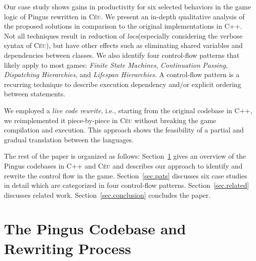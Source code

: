 \documentclass[10pt, conference, compsocconf]{IEEEtran}
\newcommand{\CEU}{\textsc{C\'{e}u}\xspace}
\newcommand{\locs}{\emph{locs}\xspace}
\begin{document}
Our case study shows gains in productivity for six selected behaviors in the
game logic of Pingus rewritten in \CEU.
We present an in-depth qualitative analysis of the proposed solutions in
comparison to the original implementations in C++.
%
Not all techniques result in reduction of \locs (especially considering the
verbose syntax of \CEU), but have other effects such as eliminating shared
variables and dependencies between classes.
%
We also identify four control-flow patterns that likely apply to most games:
        \emph{Finite State Machines},
        \emph{Continuation Passing},
        \emph{Dispatching Hierarchies}, and
        \emph{Lifespan Hierarchies}.
%
A control-flow pattern is a recurring technique to describe execution
dependency and/or explicit ordering between statements.

We employed a \emph{live code rewrite}, i.e., starting from the original
codebase in C++, we reimplemented it piece-by-piece in \CEU without breaking
the game compilation and execution.
%
This approach shows the feasibility of a partial and gradual translation
between the languages.

The rest of the paper is organized as follows:
Section~\ref{sec.codebase} gives an overview of the Pingus codebases in C++ and
\CEU and describes our approach to identify and rewrite the control flow in the
game.
Section~\ref{sec.pats} discusses six case studies in detail which are
categorized in four control-flow patterns.
Section~\ref{sec.related} discusses related work.
Section~\ref{sec.conclusion} concludes the paper.

\section{The Pingus Codebase and Rewriting Process}
\label{sec.codebase}

\end{document}
